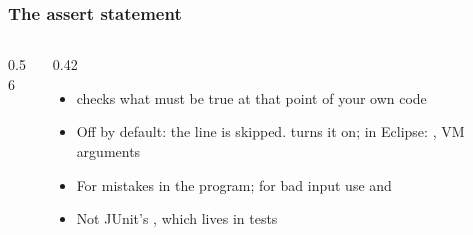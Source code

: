\documentclass[aspectratio=169,10pt,compress]{beamer}
\begin{document}
\begin{frame}[t,fragile] \frametitle{The assert statement}
	\begin{columns}[T]
		\begin{column}{0.56\textwidth}
		\end{column}
		\begin{column}{0.42\textwidth}
			\begin{itemize}\footnotesize
				\item {} checks what must be true at that point of your own code
				\item Off by default: the line is skipped.  turns it on; in Eclipse:
					  , VM arguments 
				\item For mistakes in the program; for bad input use  and 
				\item Not JUnit's , which lives in tests
			\end{itemize}
		\end{column}
	\end{columns}
\end{frame}



\fi %




\end{document}
